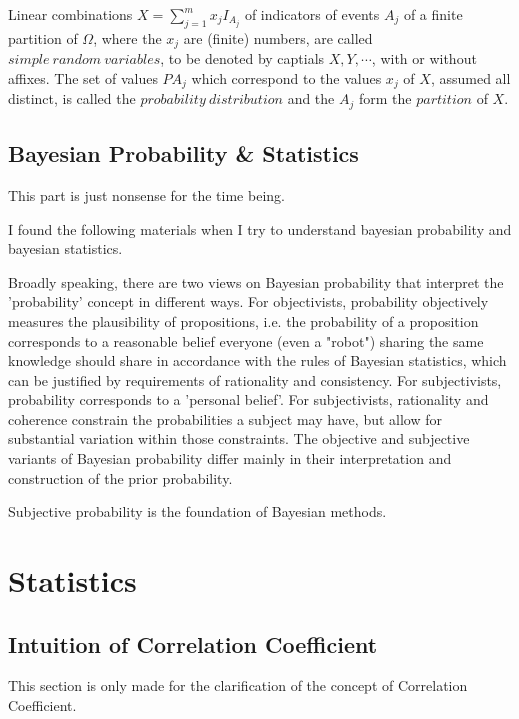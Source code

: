 \documentclass[a4paper]{book}
\begin{document}
	Linear combinations $X = \sum\limits^{m}_{j=1}x_jI_{A_j}$ of
	indicators of events $A_j$ of a finite partition of $\Omega$, where
	the $x_j$ are (finite) numbers, are called $simple\ random\
	variables$, to be denoted by captials $X, Y, \cdots$, with or without
	affixes. The set of values $PA_j$ which correspond to the values $x_j$
	of $X$, assumed all distinct, is called the $probability\
	distribution$ and the $A_j$ form the $partition$ of
	$X$.\cite{1977probability}

\section{Bayesian Probability \& Statistics}

	This part is just nonsense for the time being.

	I found the following materials when I try to understand bayesian
	probability and bayesian statistics.

	Broadly speaking, there are two views on Bayesian probability that
	interpret the 'probability' concept in different ways. For objectivists,
	probability objectively measures the plausibility of propositions, i.e.
	the probability of a proposition corresponds to a reasonable belief
	everyone (even a "robot") sharing the same knowledge should share in
	accordance with the rules of Bayesian statistics, which can be justified
	by requirements of rationality and consistency. For subjectivists,
	probability corresponds to a 'personal belief'. For subjectivists,
	rationality and coherence constrain the probabilities a subject may
	have, but allow for substantial variation within those constraints. The
	objective and subjective variants of Bayesian probability differ mainly
	in their interpretation and construction of the prior
	probability.\cite{wiki_bayesian_probability}

	Subjective probability is the foundation of Bayesian methods.
	\cite{hogg2012introduction}

\chapter{Statistics}

\section{Intuition of Correlation Coefficient}
	This section is only made for the clarification of the concept of
	Correlation Coefficient.
\end{document}
